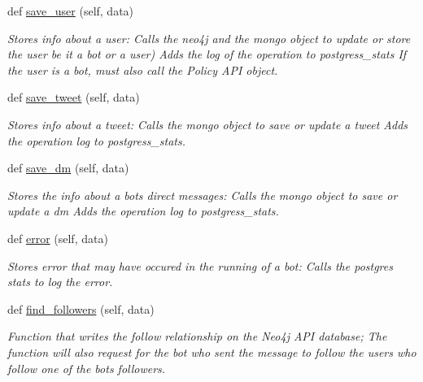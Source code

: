 \begin{DoxyCompactItemize}
def \hyperlink{classtwitter_1_1control__center_1_1dbwriter_1_1DBWriter_a38708a33bd2b8019383571275b8a0f17}{save\+\_\+user} (self, data)
\begin{DoxyCompactList}\small\item\em Stores info about a user\+: Calls the neo4j and the mongo object to update or store the user be it a bot or a user) Adds the log of the operation to postgress\+\_\+stats If the user is a bot, must also call the Policy A\+PI object. \end{DoxyCompactList}\item 
def \hyperlink{classtwitter_1_1control__center_1_1dbwriter_1_1DBWriter_a0596d9924189129c588b6c603f462d5b}{save\+\_\+tweet} (self, data)
\begin{DoxyCompactList}\small\item\em Stores info about a tweet\+: Calls the mongo object to save or update a tweet Adds the operation log to postgress\+\_\+stats. \end{DoxyCompactList}\item 
def \hyperlink{classtwitter_1_1control__center_1_1dbwriter_1_1DBWriter_a6b55377307e8c59054e0f136942c4a79}{save\+\_\+dm} (self, data)
\begin{DoxyCompactList}\small\item\em Stores the info about a bot\textquotesingle{}s direct messages\+: Calls the mongo object to save or update a dm Adds the operation log to postgress\+\_\+stats. \end{DoxyCompactList}\item 
def \hyperlink{classtwitter_1_1control__center_1_1dbwriter_1_1DBWriter_aa6e8cefc09b703abee2c4b3a68d62fd1}{error} (self, data)
\begin{DoxyCompactList}\small\item\em Stores error that may have occured in the running of a bot\+: Calls the postgres stats to log the error. \end{DoxyCompactList}\item 
def \hyperlink{classtwitter_1_1control__center_1_1dbwriter_1_1DBWriter_a65e268dcff959f29e258113ef6043a76}{find\+\_\+followers} (self, data)
\begin{DoxyCompactList}\small\item\em Function that writes the follow relationship on the Neo4j A\+PI database; The function will also request for the bot who sent the message to follow the users who follow one of the bot\textquotesingle{}s followers. \end{DoxyCompactList}\item 

\end{DoxyCompactItemize}
